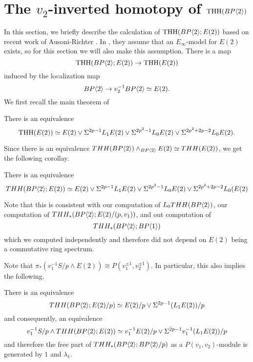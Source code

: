 
\section{The $v_2$-inverted homotopy of $\operatorname{THH}(BP\langle 2 \rangle)$}

In this section, we briefly describe the calculation of $\operatorname{THH}(BP\langle 2 \rangle;E(2))$ based on recent work of Ausoni-Richter \cite{qx}. In \cite{qx}, they assume that an $E_{\infty}$-model for $E(2)$ exists, so for this section we will also make this assumption. There is a map 
\[ \operatorname{THH}(BP\langle 2 \rangle;E(2))\to \operatorname{THH}(E(2)) \]
induced by the localization map 
\[BP\langle 2 \rangle\to v_2^{-1}BP\langle 2 \rangle\simeq E(2).\]
We first recall the main theorem of \cite{qx}
\begin{thm}
There is an equivalence 
\[ \operatorname{THH}(E(2)) \simeq E(2) \vee \Sigma^{2p-1}L_1E(2) \vee \Sigma ^{2p^2-1}L_0E(2) \vee \Sigma^{2p^2+2p-2} L_0E(2). \]
\end{thm}
Since there is an equivalence $THH(BP\langle 2 \rangle)\wedge_{BP\langle 2 \rangle}E(2)\simeq THH(E(2))$, we get the following corollay. 
\begin{cor}
There is an equivalence
\[ THH(BP\langle 2 \rangle;E(2))\simeq E(2) \vee \Sigma^{2p-1}L_1E(2) \vee  \Sigma ^{2p^2-1}L_0E(2) \vee \Sigma^{2p^2+2p-2}L_0(E(2)\]
\end{cor}
Note that this is consistent with our computation of $L_0THH(BP\langle 2 \rangle)$, our computation of $THH_*(BP\langle 2 \rangle;E(2)/(p,v_1))$, and out computation of 
\[ THH_*(BP\langle 2 \rangle;BP\langle 1 \rangle)\]
which we computed independently and therefore did not depend on $E(2)$ being a commutative ring spectrum. 

Note that $\pi_*(v_1^{-1}S/p\wedge E(2))\cong P(v_1^{\pm 1},v_2^{\pm 1})$. In particular, this also implies the following. 
\begin{cor}
There is an equivalence
\[ THH(BP\langle 2 \rangle;E(2)/p)\simeq E(2)/p \vee \Sigma^{2p-1}(L_1E(2))/p\]
and consequently, an equivalence 
\[ v_1^{-1}S/p\wedge THH(BP\langle 2 \rangle;E(2))\simeq v_1^{-1}E(2)/p\vee \Sigma^{2p-1}v_1^{-1}(L_1E(2))/p\]
and therefore the free part of 
$THH_*(BP\langle 2 \rangle;BP\langle 2 \rangle/p)$ as a $P(v_1,v_2)$-module is generated by $1$ and $\lambda_1$. 
\end{cor}
